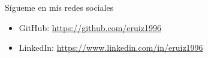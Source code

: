 \begin{frame}{Sígueme en mis redes sociales}
    \begin{itemize}
        \item[] \faGithub{} GitHub: \url{https://github.com/eruiz1996}
        \item[] \faLinkedin{} LinkedIn: \url{https://www.linkedin.com/in/eruiz1996}
    \end{itemize}
\end{frame}